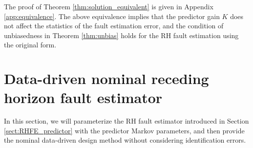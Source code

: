 \documentclass[twocolumn]{autart}
\begin{document}
The proof of Theorem \ref{thm:solution_equivalent} is given in Appendix \ref{app:equivalence}. 
The above equivalence implies that the predictor gain $K$ does not affect the statistics of the fault estimation error, and the condition of unbiasedness in Theorem \ref{thm:unbias} holds for the RH fault estimation using the original form.


\section{Data-driven nominal receding horizon fault estimator}\label{sect:RHFE_dd_nominal}
In this section, we will parameterize the RH fault estimator introduced in Section \ref{sect:RHFE_predictor} with the predictor Markov parameters, and then provide the nominal data-driven design method without considering identification errors.
\end{document}
